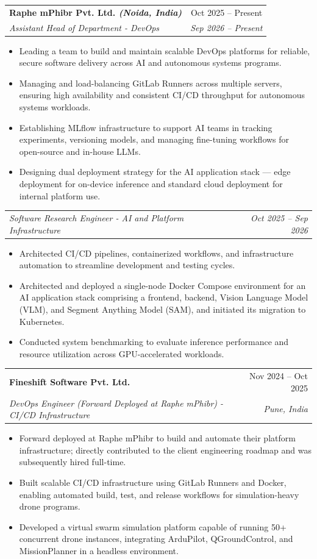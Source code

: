 \documentclass[letterpaper,11pt]{article}
\makeatletter
\newcommand{\resumeItem}[1]{\item{#1}}
\newcommand{\resumeSubheading}[4]{
  \item
    \begin{tabular*}{\linewidth}[t]{l@{\extracolsep{\fill}}r}
      \textbf{#1} & #2 \\
      \textit{\small#3} & \textit{\small #4} \\
    \end{tabular*}
}
\newcommand{\resumeRole}[2]{
  \par\vspace{4pt}
  \begin{tabular*}{\linewidth}[t]{l@{\extracolsep{\fill}}r}
    \textit{\small#1} & \textit{\small #2} \\
  \end{tabular*}
}
\newcommand{\resumeItemListStart}{\begin{itemize}[label={$\circ$}, leftmargin=0.25in, itemsep=0pt, topsep=1pt, parsep=0pt]}
\newcommand{\resumeItemListEnd}{\end{itemize}}
\makeatother
\begin{document}
  \resumeSubheading
    {Raphe mPhibr Pvt. Ltd. \textmd{\textit{\small (Noida, India)}}}{Oct 2025 -- Present}
    {Assistant Head of Department - DevOps}{Sep 2026 -- Present}
    \resumeItemListStart
      \resumeItem{Leading a team to build and maintain scalable DevOps platforms for reliable, secure software
        delivery across AI and autonomous systems programs.}
      \resumeItem{Managing and load-balancing GitLab Runners across multiple servers, ensuring high availability
        and consistent CI/CD throughput for autonomous systems workloads.}
      \resumeItem{Establishing MLflow infrastructure to support AI teams in tracking experiments, versioning
        models, and managing fine-tuning workflows for open-source and in-house LLMs.}
      \resumeItem{Designing dual deployment strategy for the AI application stack --- edge deployment for
        on-device inference and standard cloud deployment for internal platform use.}
    \resumeItemListEnd
    \resumeRole{Software Research Engineer - AI and Platform Infrastructure}{Oct 2025 -- Sep 2026}
    \resumeItemListStart
      \resumeItem{Architected CI/CD pipelines, containerized workflows, and infrastructure automation to
        streamline development and testing cycles.}
      \resumeItem{Architected and deployed a single-node Docker Compose environment for an AI application stack
        comprising a frontend, backend, Vision Language Model (VLM), and Segment Anything Model (SAM),
        and initiated its migration to Kubernetes.}
      \resumeItem{Conducted system benchmarking to evaluate inference performance and resource utilization
        across GPU-accelerated workloads.}
    \resumeItemListEnd

  \resumeSubheading
    {Fineshift Software Pvt. Ltd.}{Nov 2024 -- Oct 2025}
    {DevOps Engineer (Forward Deployed at Raphe mPhibr) - CI/CD Infrastructure}{Pune, India}
    \resumeItemListStart
      \resumeItem{Forward deployed at Raphe mPhibr to build and automate their platform infrastructure; directly
        contributed to the client engineering roadmap and was subsequently hired full-time.}
      \resumeItem{Built scalable CI/CD infrastructure using GitLab Runners and Docker, enabling automated build,
        test, and release workflows for simulation-heavy drone programs.}
      \resumeItem{Developed a virtual swarm simulation platform capable of running 50+ concurrent drone instances,
        integrating ArduPilot, QGroundControl, and MissionPlanner in a headless environment.}
    \resumeItemListEnd
\end{document}
